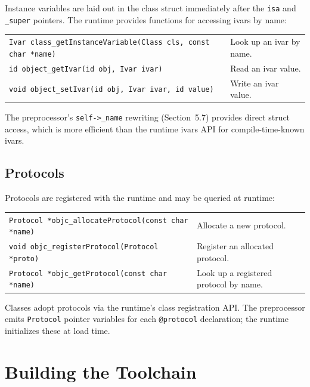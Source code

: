\documentclass[11pt,twoside]{article}
\begin{document}
Instance variables are laid out in the class struct immediately after
the {\tt isa} and {\tt \_super} pointers.  The runtime provides
functions for accessing ivars by name:

\medskip
\noindent
\begin{tabularx}{\textwidth}{lX}
{\tt Ivar class\_getInstanceVariable(Class cls, const char *name)}
  & Look up an ivar by name. \\[4pt]
{\tt id object\_getIvar(id obj, Ivar ivar)}
  & Read an ivar value. \\[4pt]
{\tt void object\_setIvar(id obj, Ivar ivar, id value)}
  & Write an ivar value. \\
\end{tabularx}

The preprocessor's {\tt self->\_name} rewriting (Section~5.7) provides
direct struct access, which is more efficient than the runtime ivars API
for compile-time-known ivars.

\subsection{Protocols}

Protocols are registered with the runtime and may be queried at runtime:

\medskip
\noindent
\begin{tabularx}{\textwidth}{lX}
{\tt Protocol *objc\_allocateProtocol(const char *name)}
  & Allocate a new protocol. \\[4pt]
{\tt void objc\_registerProtocol(Protocol *proto)}
  & Register an allocated protocol. \\[4pt]
{\tt Protocol *objc\_getProtocol(const char *name)}
  & Look up a registered protocol by name. \\
\end{tabularx}

Classes adopt protocols via the runtime's class registration API.  The
preprocessor emits {\tt Protocol} pointer variables for each
{\tt @protocol} declaration; the runtime initializes these at load time.

\newpage
\section{Building the Toolchain}
\end{document}
